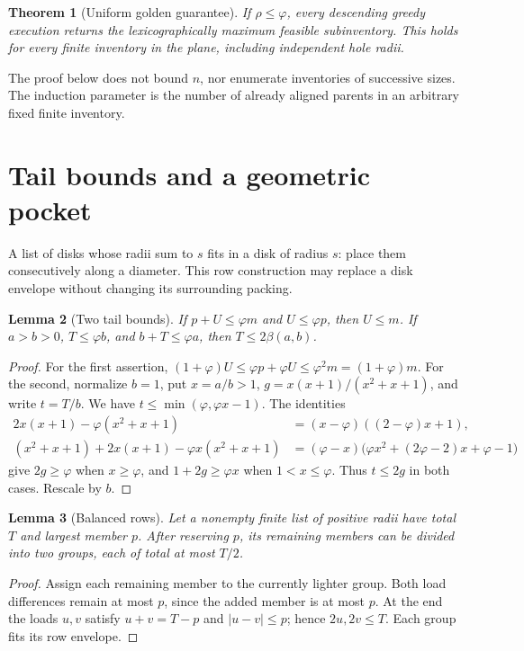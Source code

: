 \documentclass[11pt]{article}
\newtheorem{theorem}{Theorem}
\newtheorem{lemma}[theorem]{Lemma}
\theoremstyle{remark}
\newcommand{\ph}{\varphi}
\newcommand{\bp}{\beta}
\begin{document}
\begin{theorem}[Uniform golden guarantee]\label{thm:global}
If $\rho\le\ph$, every descending greedy execution returns the
lexicographically maximum feasible subinventory. This holds for every
finite inventory in the plane, including independent hole radii.
\end{theorem}

The proof below does not bound $n$, nor enumerate inventories of successive
sizes. The induction parameter is the number of already aligned parents
in an arbitrary fixed finite inventory.

\section{Tail bounds and a geometric pocket}

A list of disks whose radii sum to $s$ fits in a disk of radius $s$:
place them consecutively along a diameter. This row construction may
replace a disk envelope without changing its surrounding packing.

\begin{lemma}[Two tail bounds]\label{lem:tails}
If $p+U\le\ph m$ and $U\le\ph p$, then $U\le m$.
If $a>b>0$, $T\le\ph b$, and $b+T\le\ph a$, then
$T\le2\bp(a,b)$.
\end{lemma}
\begin{proof}
For the first assertion,
$(1+\ph)U\le\ph p+\ph U\le\ph^2m=(1+\ph)m$.
For the second, normalize $b=1$, put $x=a/b>1$,
$g=x(x+1)/(x^2+x+1)$, and write $t=T/b$. We have
$t\le\min(\ph,\ph x-1)$. The identities
\begin{align*}
 2x(x+1)-\ph(x^2+x+1)
   &=(x-\ph)((2-\ph)x+1),\\
 (x^2+x+1)+2x(x+1)-\ph x(x^2+x+1)
   &=(\ph-x)\bigl(\ph x^2+(2\ph-2)x+\ph-1\bigr)
\end{align*}
give $2g\ge\ph$ when $x\ge\ph$, and
$1+2g\ge\ph x$ when $1<x\le\ph$. Thus $t\le2g$ in
both cases. Rescale by $b$.
\end{proof}

\begin{lemma}[Balanced rows]\label{lem:split}
Let a nonempty finite list of positive radii have total $T$ and largest
member $p$. After reserving $p$, its remaining members can be divided
into two groups, each of total at most $T/2$.
\end{lemma}
\begin{proof}
Assign each remaining member to the currently lighter group. Both load
differences remain at most $p$, since the added member is at most $p$.
At the end the loads $u,v$ satisfy $u+v=T-p$ and $|u-v|\le p$;
hence $2u,2v\le T$. Each group fits its row envelope.
\end{proof}
\end{document}
